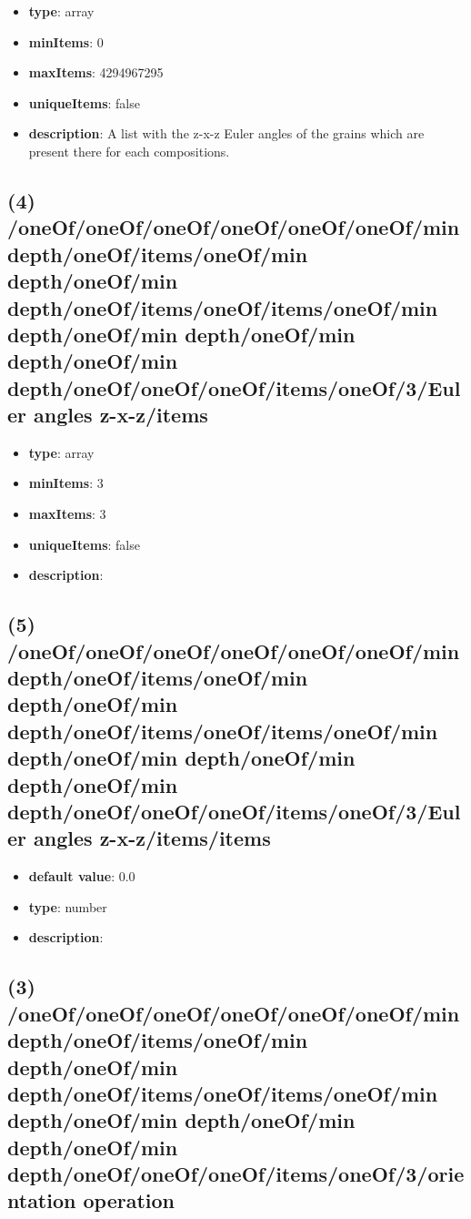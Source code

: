 \begin{itemize}[leftmargin=3em]\item {\bf type}: array
\item {\bf minItems}: 0
\item {\bf maxItems}: 4294967295
\item {\bf uniqueItems}: false
\item {\bf description}: A list with the z-x-z Euler angles of the grains which are present there for each compositions.
\end{itemize}\subsection{(4) /oneOf/oneOf/oneOf/oneOf/oneOf/oneOf/min depth/oneOf/items/oneOf/min depth/oneOf/min depth/oneOf/items/oneOf/items/oneOf/min depth/oneOf/min depth/oneOf/min depth/oneOf/min depth/oneOf/oneOf/oneOf/items/oneOf/3/Euler angles z-x-z/items}
\begin{itemize}[leftmargin=4em]\item {\bf type}: array
\item {\bf minItems}: 3
\item {\bf maxItems}: 3
\item {\bf uniqueItems}: false
\item {\bf description}: 
\end{itemize}\subsection{(5) /oneOf/oneOf/oneOf/oneOf/oneOf/oneOf/min depth/oneOf/items/oneOf/min depth/oneOf/min depth/oneOf/items/oneOf/items/oneOf/min depth/oneOf/min depth/oneOf/min depth/oneOf/min depth/oneOf/oneOf/oneOf/items/oneOf/3/Euler angles z-x-z/items/items}
\begin{itemize}[leftmargin=5em]\item {\bf default value}: 0.0
\item {\bf type}: number
\item {\bf description}: 
\end{itemize}\subsection{(3) /oneOf/oneOf/oneOf/oneOf/oneOf/oneOf/min depth/oneOf/items/oneOf/min depth/oneOf/min depth/oneOf/items/oneOf/items/oneOf/min depth/oneOf/min depth/oneOf/min depth/oneOf/min depth/oneOf/oneOf/oneOf/items/oneOf/3/orientation operation}
